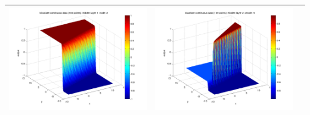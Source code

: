 \documentclass[fleqn]{article}
\begin{document}
\begin{center}
\begin{longtable}{ c | c | r }
    \includegraphics[scale=0.25]{./pics/bivariate100/_2_4/_2_4_epoch_2_hidden layer 1 :2} &   \includegraphics[scale=0.25]{./pics/bivariate100/_2_4/_2_4_epoch_2_hidden layer 2 :24} & \\
   \hline
  \end{longtable}
\end{center}
\end{document}
